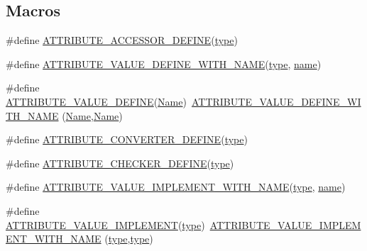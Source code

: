 \subsection*{Macros}
\begin{DoxyCompactItemize}
\item 
\#define \hyperlink{group__attributehelper_ga519d95abe8e9c19556f76ad477a565f0}{A\+T\+T\+R\+I\+B\+U\+T\+E\+\_\+\+A\+C\+C\+E\+S\+S\+O\+R\+\_\+\+D\+E\+F\+I\+NE}(\hyperlink{visualizer-ideas_8txt_add98db9e15e2a58cf2b57623e7aa893a}{type})
\item 
\#define \hyperlink{group__attributehelper_ga461d4534c2f53641710e5f297bf3fd2c}{A\+T\+T\+R\+I\+B\+U\+T\+E\+\_\+\+V\+A\+L\+U\+E\+\_\+\+D\+E\+F\+I\+N\+E\+\_\+\+W\+I\+T\+H\+\_\+\+N\+A\+ME}(\hyperlink{visualizer-ideas_8txt_add98db9e15e2a58cf2b57623e7aa893a}{type},  \hyperlink{generate__test__data__lte__spectrum__model_8m_ab74e6bf80237ddc4109968cedc58c151}{name})
\item 
\#define \hyperlink{group__attributehelper_ga5ac225e7d58b2ad6e1e2343ee56a6517}{A\+T\+T\+R\+I\+B\+U\+T\+E\+\_\+\+V\+A\+L\+U\+E\+\_\+\+D\+E\+F\+I\+NE}(\hyperlink{tcp-test_8cc_a2f86f929dfaa0d376512285018ea86fc}{Name})~\hyperlink{group__attributehelper_ga461d4534c2f53641710e5f297bf3fd2c}{A\+T\+T\+R\+I\+B\+U\+T\+E\+\_\+\+V\+A\+L\+U\+E\+\_\+\+D\+E\+F\+I\+N\+E\+\_\+\+W\+I\+T\+H\+\_\+\+N\+A\+ME} (\hyperlink{tcp-test_8cc_a2f86f929dfaa0d376512285018ea86fc}{Name},\hyperlink{tcp-test_8cc_a2f86f929dfaa0d376512285018ea86fc}{Name})
\item 
\#define \hyperlink{group__attributehelper_gaa99cc69cf0f73daaa6bf5a144a4dca13}{A\+T\+T\+R\+I\+B\+U\+T\+E\+\_\+\+C\+O\+N\+V\+E\+R\+T\+E\+R\+\_\+\+D\+E\+F\+I\+NE}(\hyperlink{visualizer-ideas_8txt_add98db9e15e2a58cf2b57623e7aa893a}{type})
\item 
\#define \hyperlink{group__attributehelper_gaef34179c09dc1e1546805d8370256067}{A\+T\+T\+R\+I\+B\+U\+T\+E\+\_\+\+C\+H\+E\+C\+K\+E\+R\+\_\+\+D\+E\+F\+I\+NE}(\hyperlink{visualizer-ideas_8txt_add98db9e15e2a58cf2b57623e7aa893a}{type})
\item 
\#define \hyperlink{group__attributehelper_gac0f2b2a49d760f6e178638ec92cb13c2}{A\+T\+T\+R\+I\+B\+U\+T\+E\+\_\+\+V\+A\+L\+U\+E\+\_\+\+I\+M\+P\+L\+E\+M\+E\+N\+T\+\_\+\+W\+I\+T\+H\+\_\+\+N\+A\+ME}(\hyperlink{visualizer-ideas_8txt_add98db9e15e2a58cf2b57623e7aa893a}{type},  \hyperlink{generate__test__data__lte__spectrum__model_8m_ab74e6bf80237ddc4109968cedc58c151}{name})
\item 
\#define \hyperlink{group__attributehelper_gaec2ccb5e5fc1c8656fe3ace388719d92}{A\+T\+T\+R\+I\+B\+U\+T\+E\+\_\+\+V\+A\+L\+U\+E\+\_\+\+I\+M\+P\+L\+E\+M\+E\+NT}(\hyperlink{visualizer-ideas_8txt_add98db9e15e2a58cf2b57623e7aa893a}{type})~\hyperlink{group__attributehelper_gac0f2b2a49d760f6e178638ec92cb13c2}{A\+T\+T\+R\+I\+B\+U\+T\+E\+\_\+\+V\+A\+L\+U\+E\+\_\+\+I\+M\+P\+L\+E\+M\+E\+N\+T\+\_\+\+W\+I\+T\+H\+\_\+\+N\+A\+ME} (\hyperlink{visualizer-ideas_8txt_add98db9e15e2a58cf2b57623e7aa893a}{type},\hyperlink{visualizer-ideas_8txt_add98db9e15e2a58cf2b57623e7aa893a}{type})

\end{DoxyCompactItemize}
